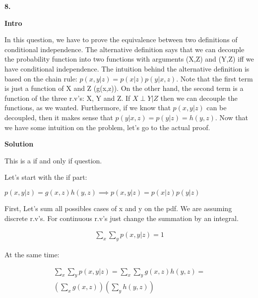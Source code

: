 \documentclass[a4paper,10pt]{book}
\begin{document}
\textbf{8.}

\textbf{Intro} \par

In this question, we have to prove the equivalence between two definitions of
conditional independence. The alternative definition says that we can decouple the probability function into
two functions with arguments (X,Z) and (Y,Z) iff we have conditional independence. The intuition behind 
the alternative definition is based on the chain rule: $p(x, y| z) = p(x | z)p(y | x, z)$. 
Note that the first term is just a function of X and Z (g(x,z)). On the other hand, the second term
is a function of the three r.v's: X, Y and Z. If $X \perp Y | Z$ then we can decouple the functions, 
as we wanted. Furthermore, if we know that $p(x, y| z)$ can be decoupled, then it makes sense that
$p(y | x, z) = p(y | z) = h(y, z)$. Now that we have some intuition on the problem, let's go to the
actual proof.\par


\textbf{Solution} \par

This is a if and only if question.


Let's start with the if part: \par

$p(x,y|z) = g(x,z)h(y,z) \implies p(x,y|z) = p(x|z)p(y|z)$

First, Let's sum all possibles cases of x and y on the pdf. 
We are assuming discrete r.v's. For continuous r.v's just change the summation by an integral.

\begin{equation}
\begin{split}
\sum_{x}\sum_{y}p(x,y|z) = 1
\end{split}
\end{equation}

At the same time:

\begin{equation}
\begin{split}
\sum_{x}\sum_{y}p(x,y|z) = \sum_{x}\sum_{y}g(x,z)h(y,z) = \\
(\sum_{x}g(x,z))(\sum_{y}h(y,z))
\end{split}
\end{equation}
\end{document}
